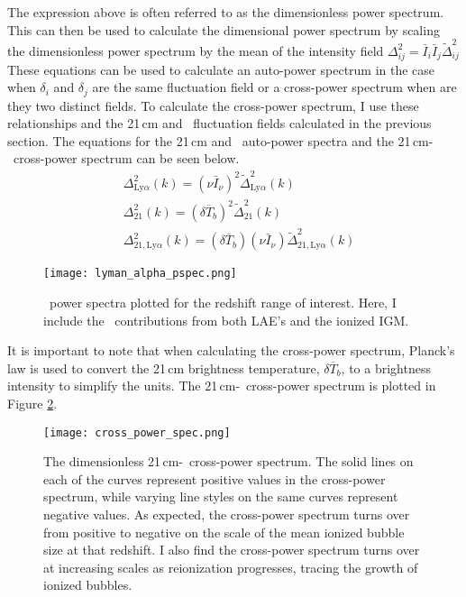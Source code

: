 The expression above is often referred to as the dimensionless power spectrum.
This can then be used to calculate the dimensional power spectrum by scaling the
dimensionless power spectrum by the mean of the intensity field $\Delta^2_{ij} = \bar{I}_i \bar{I}_j \widetilde{\Delta}^2_{ij}$
These equations can be used to calculate an auto-power spectrum in the case when
$\delta_i$ and $\delta_j$ are the same fluctuation field or a cross-power spectrum
when are they two distinct fields. To calculate the cross-power spectrum, I use
these relationships and the 21\,cm and \lya\ fluctuation fields calculated in the
previous section. The equations for the 21\,cm and \lya\ auto-power spectra and the
21\,cm-\lya\ cross-power spectrum can be seen below.
\begin{align}
    &\Delta^2_{\textrm{Ly} \alpha} \left( k \right) = \left( \nu \bar{I}_{\nu} \right)^2 \widetilde{\Delta}^2_{\textrm{Ly} \alpha} \left( k \right) \\
    &\Delta^2_{21}\left( k \right) = \left(\delta \overline{T}_b \right)^2 \widetilde{\Delta}^2_{21} \left( k \right) \\
    &\Delta^2_{21, \textrm{Ly} \alpha} \left( k \right) = \left(\delta \overline{T}_b \right) \left( \nu \bar{I}_{\nu} \right) \widetilde{\Delta}^2_{21, \textrm{Ly} \alpha} \left( k \right)
\end{align}

\begin{figure}[ht]
	\centering
	\texttt{[image: lyman\_alpha\_pspec.png]}
	\caption[\lya\ Power Spectrum]{\lya\ power spectra plotted for the redshift range of interest. Here, I include
           the \lya\ contributions from both LAE's and the ionized IGM.}
	\label{fig:lya_ps}
\end{figure}

It is important to note that when calculating the cross-power spectrum, Planck's
law is used to convert the 21\,cm brightness temperature, $\delta \overline{T}_b$,
to a brightness intensity to simplify the units. The 21\,cm-\lya\ cross-power spectrum
is plotted in Figure \ref{fig:x_ps}.

\begin{figure}[ht]
	\centering
	\texttt{[image: cross\_power\_spec.png]}
	\caption[21\,cm-\lya\ Cross-Power Spectrum]{The dimensionless 21\,cm-\lya\ cross-power spectrum. The
           solid lines on each of the curves represent positive values in the cross-power spectrum, while varying line
           styles on the same curves represent negative values. As expected, the cross-power spectrum turns over from
           positive to negative on the scale of the mean ionized bubble size at that redshift. I also find the cross-power
           spectrum turns over at increasing scales as reionization progresses, tracing the growth of ionized bubbles.}
	\label{fig:x_ps}
\end{figure}

